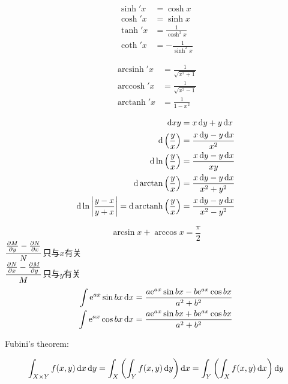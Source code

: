 \documentclass{ctexart}
\DeclareMathOperator{\arccosh}{arccosh}
\DeclareMathOperator{\arcsinh}{arcsinh}
\DeclareMathOperator{\arctanh}{arctanh}
\begin{document}
\begin{align*}
    \sinh' x & = \cosh x                \\
    \cosh' x & = \sinh x                \\
    \tanh' x & = \frac{1}{\cosh^{2}x}   \\
    \coth' x & =- \frac{1}{\sinh^{2} x}
\end{align*}

\begin{align*}
    \arcsinh' x & =\frac{1}{\sqrt{x^{2}+1}} \\
    \arccosh' x & =\frac{1}{\sqrt{x^{2}-1}} \\
    \arctanh' x & =\frac{1}{1-x^{2}}
\end{align*}

\begin{align*}
    \d{xy}
    & =x\d{y}+y\d{x}                     \\
    \d{\left( \frac{y}{x} \right)}
    & =\frac{x\d{y}-y\d{x}}{x^{2}}       \\
    \d{\ln \left( \frac{y}{x} \right)}
    & =\frac{x\d{y}-y\d{x}}{xy}          \\
    \d{\arctan \left( \frac{y}{x} \right)}
    & =\frac{x\d{y}-y\d{x}}{x^{2}+y^{2}} \\
    \d{\ln \left| \frac{y - x}{y + x} \right|=\mathrm{d}
    \arctanh \left( \frac{y}{x} \right)} &
    =\frac{x\d{y}-y\d{x}}{x^{2}-y^{2}} \\
\end{align*}

\[\arcsin x +\arccos x =\frac{\pi}{2} \]
\(\dfrac{\pdv{M}{y} - \pdv{N}{x}}{N}\)只与\(x\)有关 \\
\(\dfrac{\pdv{N}{x} - \pdv{M}{y}}{M}\)只与\(y\)有关 \\

\begin{align*}
    \int \e^{ax} \sin bx \d{x} & =\frac{a\e^{ax} \sin bx -
    b\e^{ax}\cos bx}{a^{2}+b^{2}} \\
    \int \e^{ax} \cos bx \d{x} & =\frac{a\e^{ax} \sin bx +
    b\e^{ax}\cos bx}{a^{2}+b^{2}} \\
\end{align*}

Fubini's theorem:

\[
    \int_{X\times Y}  f(x, y) \d{x}\d{y} = \int_{X} \left(
        \int_{Y} f(x, y) \d{y} \right) \d{x} = \int_{Y} \left(
    \int_{X} f(x, y) \d{x} \right) \d{y}
\]

\end{document}
